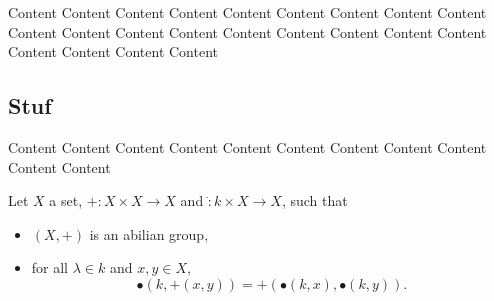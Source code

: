 \newlecture

Content Content Content Content Content Content Content Content Content Content Content 
Content Content Content Content Content Content Content Content Content Content Content 

\subsection{Stuf}
Content Content Content Content Content Content Content Content Content Content Content 

\begin{defn}
Let $X$ a set, $+: X\times X \to X$ and $\dot : k \times X \to X$, such that 
\begin{itemize}
\item
$(X,+)$ is an abilian group,
\item 
for all $\lambda \in k$ and $x,y\in X$,
\[ \bullet( k, +(x, y) ) = +( \bullet(k,x), \bullet(k,y)). \]
\end{itemize}
\end{defn}


